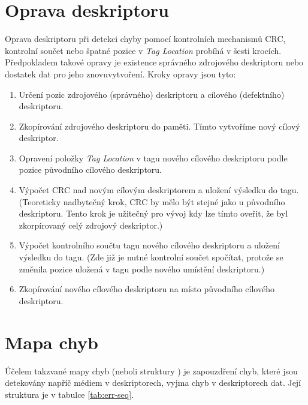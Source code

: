 \section{Oprava deskriptoru}
\label{sec:oprava-deskriptoru}
Oprava deskriptoru při detekci chyby pomocí kontrolních mechanismů CRC, kontrolní součet nebo špatné pozice v \textit{Tag Location} probíhá v šesti krocích. Předpokladem takové opravy je existence správného zdrojového deskriptoru nebo dostatek dat pro jeho znovuvytvoření. Kroky opravy jsou tyto:
\begin{enumerate}
    \item Určení pozic zdrojového (správného) deskriptoru a cílového (defektního) deskriptoru.
    \item Zkopírování zdrojového deskriptoru do paměti. Tímto vytvoříme nový cílový deskriptor.
    \item Opravení položky \textit{Tag Location} v tagu nového cílového deskriptoru podle pozice původního cílového deskriptoru.
    \item Výpočet CRC nad novým cílovým deskriptorem a uložení výsledku do tagu. (Teoreticky nadbytečný krok, CRC by mělo být stejné jako u původního deskriptoru. Tento krok je užitečný pro vývoj kdy lze tímto oveřit, že byl zkorpírovaný celý zdrojový deskriptor.)
    \item Výpočet kontrolního součtu tagu nového cílového deskriptoru a uložení výsledku do tagu. (Zde již je nutné kontrolní součet spočítat, protože se změnila pozice uložená v tagu podle nového umístění deskriptoru.)
    \item Zkopírování nového cílového deskriptoru na místo původního cílového deskriptoru.
\end{enumerate}

\section{Mapa chyb}
\label{sec:mapa-chyb}
Účelem takzvané mapy chyb (neboli struktury \texttt{}) je zapouzdření chyb, které jsou detekovány napříč médiem v deskriptorech, vyjma chyb v deskriptorech dat. Její struktura je v tabulce \ref{tab:err-seq}.


